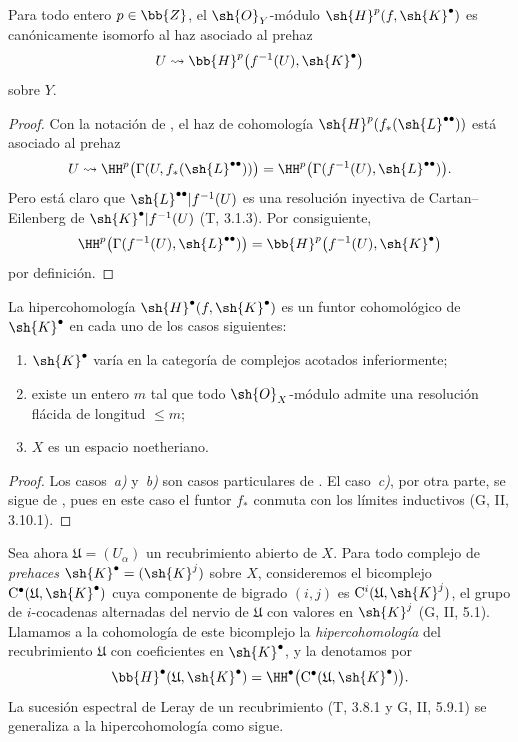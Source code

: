 \documentclass[oneside]{amsart}
\renewcommand{\leq}{\leqslant}
\let\EGAOriginalLabel\label
\renewcommand{\label}[1]{\phantomsection\EGAOriginalLabel{#1}}
\begin{document}
\begin{proposition}[12.4.3]
\label{0.12.4.3}
Para todo entero $p\in\bb{Z}$, el $\sh{O}_Y$-módulo
$\sh{H}^p(f,\sh{K}^\bullet)$ es canónicamente isomorfo al haz
asociado al prehaz
\[
  U\leadsto
  \bb{H}^p\bigl(f^{-1}(U),\sh{K}^\bullet\bigr)
\]
sobre $Y$.
\end{proposition}

\begin{proof}
Con la notación de , el haz de cohomología
$\sh{H}^p(f_*(\sh{L}^{\bullet\bullet}))$ está asociado al
prehaz
\[
  U\leadsto
  \HH^p\bigl(\Gamma(U,f_*(\sh{L}^{\bullet\bullet}))\bigr)
  =
  \HH^p\bigl(\Gamma(f^{-1}(U),\sh{L}^{\bullet\bullet})\bigr).
\]
Pero está claro que
$\sh{L}^{\bullet\bullet}|f^{-1}(U)$ es una resolución inyectiva de
Cartan--Eilenberg de $\sh{K}^\bullet|f^{-1}(U)$ (T, 3.1.3).
Por consiguiente,
\[
  \HH^p\bigl(\Gamma(f^{-1}(U),\sh{L}^{\bullet\bullet})\bigr)
  =
  \bb{H}^p\bigl(f^{-1}(U),\sh{K}^\bullet\bigr)
\]
por definición.
\end{proof}

\begin{proposition}[12.4.4]
\label{0.12.4.4}
La hipercohomología $\sh{H}^\bullet(f,\sh{K}^\bullet)$ es un
funtor cohomológico de $\sh{K}^\bullet$ en cada uno de los casos
siguientes:
\begin{enumerate}
  \item[\rm{a)}] $\sh{K}^\bullet$ varía en la categoría de complejos
    acotados inferiormente;
  \item[\rm{b)}] existe un entero $m$ tal que todo
    $\sh{O}_X$-módulo admite una resolución flácida de longitud $\leq m$;
  \item[\rm{c)}] $X$ es un espacio noetheriano.
\end{enumerate}
\end{proposition}

\begin{proof}
Los casos~\emph{a)} y~\emph{b)} son casos particulares de .
El caso~\emph{c)}, por otra parte, se sigue de , pues en
este caso el funtor $f_*$ conmuta con los límites inductivos
(G, II, 3.10.1).
\end{proof}

\begin{env}[12.4.5]
\label{0.12.4.5}
Sea ahora $\mathfrak{U}=(U_\alpha)$ un recubrimiento abierto de $X$.
Para todo complejo de \emph{prehaces}
$\sh{K}^\bullet=(\sh{K}^j)$ sobre $X$, consideremos el bicomplejo
$\mathrm{C}^\bullet(\mathfrak{U},\sh{K}^\bullet)$ cuya
componente de bigrado $(i,j)$ es
$\mathrm{C}^i(\mathfrak{U},\sh{K}^j)$, el grupo de
$i$-cocadenas alternadas del nervio de $\mathfrak{U}$ con valores
en $\sh{K}^j$ (G, II, 5.1).
Llamamos a la cohomología de este bicomplejo la
\emph{hipercohomología} del recubrimiento $\mathfrak{U}$ con
coeficientes en $\sh{K}^\bullet$, y la denotamos por
\[
  \bb{H}^\bullet(\mathfrak{U},\sh{K}^\bullet)
  =
  \HH^\bullet
  \bigl(\mathrm{C}^\bullet
    (\mathfrak{U},\sh{K}^\bullet)\bigr).
\]
La sucesión espectral de Leray de un recubrimiento
(T, 3.8.1 y G, II, 5.9.1) se generaliza a la hipercohomología como sigue.
\end{env}
\end{document}
